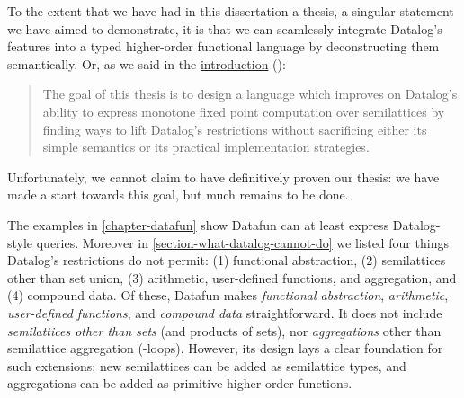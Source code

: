 


\noindent
To the extent that we have had in this dissertation a thesis, a singular statement
we have aimed to demonstrate, it is that we can seamlessly integrate Datalog's
features into a typed higher-order functional language by deconstructing them
semantically.
%
Or, as we said in the \hyperref[goal-of-thesis]{introduction}
():

\begin{quote}
  The goal of this thesis is to design a language which improves on Datalog's
  ability to express monotone fixed point computation over semilattices by
  finding ways to lift Datalog's restrictions without sacrificing either its
  simple semantics or its practical implementation strategies.
\end{quote}

\noindent
Unfortunately, we cannot claim to have definitively proven our thesis: we have
made a start towards this goal, but much remains to be done.

The examples in \cref{chapter-datafun} show Datafun can at least express
Datalog-style queries. Moreover in \cref{section-what-datalog-cannot-do} we
listed four things Datalog's restrictions do not permit: (1) functional
abstraction, (2) semilattices other than set union, (3) arithmetic, user-defined
functions, and aggregation, and (4) compound data.
%
Of these, Datafun makes \emph{functional abstraction}, \emph{arithmetic}, \emph{user-defined functions}, and \emph{compound data} straightforward.
%
It does not include \emph{semilattices other than sets} (and products of sets),
nor \emph{aggregations} other than semilattice aggregation (-loops).
%
However, its design lays a clear foundation for such extensions: new
semilattices can be added as semilattice types, and aggregations can be added as
primitive higher-order functions.
%

